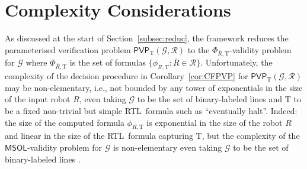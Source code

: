 \documentclass{aamas2015}
\def\RTL{\textsf{RTL}}
\def\gclass{\mathcal{G}}
\def\rclass{\mathcal{R}}
\def\T{\mathrm{T}}
\def\pn{\mathbf{ports}}
\def\PVP{\mathsf{PVP}}
\newcommand{\tup}[1]{\overline{#1}}
\def\msol{\mathsf{MSOL}}
\def\Bij{\textrm{Bij}(\Delta)}
\begin{document}
%








\section{Complexity Considerations}

As discussed at the start of Section~\ref{subsec:reduc}, the framework reduces the parameterised verification problem $\PVP_\T(\gclass,\rclass)$ to the $\Phi_{\tup{R},\T}$-validity problem for $\gclass$ where $\Phi_{\tup{R},\T}$ is the set of formulas $\{\phi_{\tup{R},\T} : \tup{R} \in \rclass\}$. Unfortunately, the complexity of the decision procedure in Corollary~\ref{cor:CFPVP} for $\PVP_\T(\gclass,\rclass)$ may be non-elementary, i.e., not bounded by any tower of exponentials in the size of the input robot $R$, even taking $\gclass$ to be the set of binary-labeled lines and $\T$ to be a fixed non-trivial but simple \RTL\ formula such as ``eventually halt''. Indeed: the size of the computed formula $\phi_{R,\T}$ is exponential in the size of the robot $R$ and linear in the size of the \RTL\ formula capturing $\T$, but the complexity of the $\msol$-validity problem for $\gclass$ is non-elementary even taking $\gclass$ to be the set of binary-labeled lines \cite{Stock74}.
\end{document}
